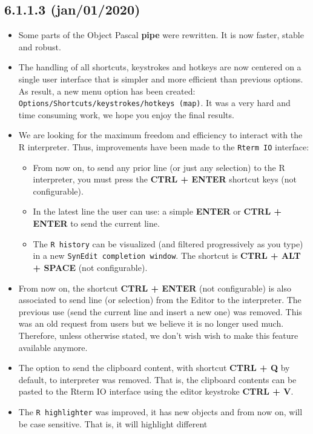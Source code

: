 \subsection*{6.1.1.3 (jan/01/2020)}
\begin{itemize}
  \item Some parts of the Object Pascal \textbf{pipe} were rewritten. It is now faster, stable and robust.
  \item The handling of all shortcuts, keystrokes and hotkeys are now centered on a single user interface
    that is simpler and more efficient than previous options. As result, a new menu option has been
    created: \texttt{Options/Shortcuts/keystrokes/hotkeys (map)}. It was a very hard and time consuming work,
    we hope you enjoy the final results.
  \item We are looking for the maximum freedom and efficiency to interact with the R interpreter.
    Thus, improvements have been made to the \texttt{Rterm IO} interface:
    \begin{itemize}
      \item From now on, to send any prior line (or just any selection) to the R interpreter, you must press the
        \textbf{CTRL + ENTER} shortcut keys (not configurable).
      \item In the latest line the user can use: a simple \textbf{ENTER} or \textbf{CTRL + ENTER} to send the current line.
      \item The \texttt{R history} can be visualized (and filtered progressively as you type) in a new \texttt{SynEdit completion window}.
        The shortcut is \textbf{CTRL + ALT + SPACE} (not configurable).
    \end{itemize}
  \item From now on, the shortcut \textbf{CTRL + ENTER} (not configurable) is also associated to send line (or selection) from the
    Editor to the \RR{} interpreter. The previous use (send the current line and insert a new one) was removed. This was an old request
    from users but we believe it is no longer used much. Therefore, unless otherwise stated, we don't wish wish to make this feature available anymore.
  \item The option to send the clipboard content, with shortcut \textbf{CTRL + Q} by default, to \RR{} interpreter was removed. That is, the clipboard
    contents can be pasted to the Rterm IO interface using the editor keystroke \textbf{CTRL + V}.
  \item The \texttt{R highlighter} was improved, it has new objects and from now on, will be case sensitive. That is, it will highlight different

\end{itemize}
